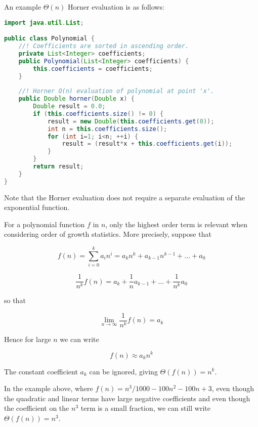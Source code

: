\documentclass[a4paper,12pt]{article}
\begin{document}
An example $\Theta(n)$ Horner evaluation is as follows:

\begin{lstlisting}[language=Java]
import java.util.List;

public class Polynomial {
    //! Coefficients are sorted in ascending order.
    private List<Integer> coefficients;
    public Polynomial(List<Integer> coefficients) {
        this.coefficients = coefficients;
    }
    
    //! Horner O(n) evaluation of polynomial at point 'x'.
    public Double horner(Double x) {
        Double result = 0.0;
        if (this.coefficients.size() != 0) {
            result = new Double(this.coefficients.get(0));
            int n = this.coefficients.size();
            for (int i=1; i<n; ++i) {
                result = (result*x + this.coefficients.get(i));
            }
        }
        return result;
    }
}    
\end{lstlisting}

Note that the Horner evaluation does not require a separate evaluation of the exponential function.

\vspace{5mm}


For a polynomial function $f$ in $n$, only the highest order term is relevant when considering order of growth statistics. More precisely, suppose that 

\[ f(n) = \sum_{i=0}^k a_in^i = a_kn^k + a_{k-1}n^{k-1} + ... + a_0 \]

\[ \frac{1}{n^k} f(n) = a_k + \frac{1}{n} a_{k-1} + ...  + \frac{1}{n^k}a_0  \]

so that

\[ \lim_{n \rightarrow \infty} \frac{1}{n^k}f(n) = a_k \]

Hence for large $n$ we can write

\[ f(n) \approx a_k n^k \]

The constant coefficient $a_k$ can be ignored, giving $\Theta(f(n)) = n^k$.

In the example above, where $f(n) = n^3/1000 - 100n^2 - 100n + 3$, even though the quadratic and linear
terms have large negative coefficients and even though the coefficient on the $n^3$ term is a small fraction,
we can still write $\Theta(f(n)) = n^3$.
\end{document}
